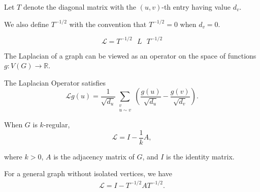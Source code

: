 \begin{definition}
\label{def:T_sqrt}
\leanok
Let $T$ denote the diagonal matrix with the $(u,v)$-th entry having value $d_v$.
\end{definition}



\begin{definition}
\label{def:T_inv_sqrt}
\leanok
We also define $T^{-1/2}$ with the convention that $T^{-1/2} = 0$ when $d_v = 0$.
\end{definition}



\begin{lemma} 
\label{lem:Lap_symmetric_normalization}
\leanok
\[
\mathcal{L} = T^{-1/2} \text{ } L \text{ } T^{-1/2}
\]
\end{lemma}



\begin{definition}
\label{def:LapOperator}
\leanok
The Laplacian of a graph can be viewed as an operator on the space of functions $g : V(G) \rightarrow \mathbb{R}$.
\end{definition}


\begin{definition}
\label{def:LapOpFormula}
\leanok
The Laplacian Operator satisfies
\[
\mathcal{L}g(u) = \frac{1}{\sqrt{d_u}} \sum_{\substack{v \\ u \sim v}} \left( \frac{g(u)}{\sqrt{d_u}} - \frac{g(v)}{\sqrt{d_v}} \right).
\]
\end{definition}



\begin{lemma}
\label{lem:LapOfRegGraph}
\leanok
When $G$ is $k$-regular,
\[
\mathcal{L} = I - \frac{1}{k} A,
\]  
\end{lemma}
where $k > 0$, $A$ is the adjacency matrix of $G$, and $I$ is the identity matrix.



\begin{lemma}
\label{lem:LapOfNotIsolatedGraph}
\leanok
For a general graph without isolated vertices, we have
\[
\begin{aligned}
\mathcal{L} = I - T^{-1/2} A T^{-1/2}.
\end{aligned}
\]
\end{lemma}



